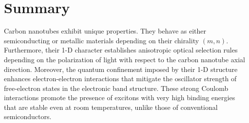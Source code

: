 \section{Summary}

Carbon nanotubes exhibit unique properties. They behave as either semiconducting or metallic materials depending on their chirality $(m,n)$. Furthermore, their 1-D character establishes anisotropic optical selection rules depending on the polarization of light with respect to the carbon nanotube axial direction. Moreover, the quantum confinement imposed by their 1-D structure enhances electron-electron interactions that mitigate the oscillator strength of free-electron states in the electronic band structure. These strong Coulomb interactions promote the presence of excitons with very high binding energies that are stable even at room temperatures, unlike those of conventional semiconductors. 
